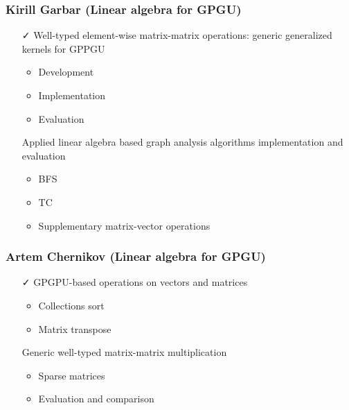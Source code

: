 \documentclass[xcolor=table,aspectratio=169]{beamer}
\begin{document}
\begin{frame}[fragile]
  \frametitle{Kirill Garbar (Linear algebra for GPGU)}
  \begin{minipage}[t]{0.48\textwidth}
    \begin{itemize}
      \item[\faCheck] Well-typed element-wise matrix-matrix operations: generic generalized kernels for GPPGU 
      \begin{itemize}
        \item Development
        \item Implementation
        \item Evaluation        
      \end{itemize}      
    \end{itemize}
  \end{minipage}
  \pause
  \begin{minipage}[t]{0.48\textwidth}
    \begin{itemize}
      \item[\faHourglassHalf] Applied linear algebra based graph analysis algorithms implementation and evaluation
      \begin{itemize}
        \item BFS
        \item TC
        \item Supplementary matrix-vector operations
      \end{itemize}      
    \end{itemize}
  \end{minipage}
\end{frame}

\begin{frame}[fragile]
  \frametitle{Artem Chernikov (Linear algebra for GPGU)}
  \begin{minipage}[t]{0.48\textwidth}
    \begin{itemize}
      \item[\faCheck] GPGPU-based operations on vectors and matrices
      \begin{itemize}
        \item Collections sort
        \item Matrix transpose
      \end{itemize} 
    \end{itemize}
  \end{minipage}
  \pause
  \begin{minipage}[t]{0.48\textwidth}
    \begin{itemize}
      \item[\faHourglassHalf] Generic well-typed matrix-matrix multiplication
      \begin{itemize}
        \item Sparse matrices
        \item Evaluation and comparison
      \end{itemize} 
    \end{itemize}
  \end{minipage}
\end{frame}
\end{document}
